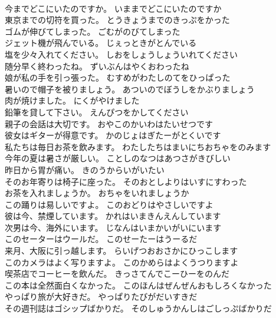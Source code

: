 \documentclass[8pt]{extreport}
\begin{document}
\begin{CJK}{UTF8}{min}
\\	今までどこにいたのですか。	いままでどこにいたのですか 
\\	東京までの切符を買った。	とうきょうまでのきっぷをかった 
\\	ゴムが伸びてしまった。	ごむがのびてしまった 
\\	ジェット機が飛んでいる。	じぇっときがとんでいる 
\\	塩を少々入れてください。	しおをしょうしょういれてください 
\\	随分早く終わったね。	ずいぶんはやくおわったね 
\\	娘が私の手を引っ張った。	むすめがわたしのてをひっぱった 
\\	暑いので帽子を被りましょう。	あついのでぼうしをかぶりましょう 
\\	肉が焼けました。	にくがやけました 
\\	鉛筆を貸して下さい。	えんぴつをかしてください 
\\	親子の会話は大切です。	おやこのかいわはたいせつです 
\\	彼女はギターが得意です。	かのじょはぎたーがとくいです 
\\	私たちは毎日お茶を飲みます。	わたしたちはまいにちおちゃをのみます 
\\	今年の夏は暑さが厳しい。	ことしのなつはあつさがきびしい 
\\	昨日から胃が痛い。	きのうからいがいたい 
\\	そのお年寄りは椅子に座った。	そのおとしよりはいすにすわった 
\\	お茶を入れましょうか。	おちゃをいれましょうか 
\\	この踊りは易しいですよ。	このおどりはやさしいですよ 
\\	彼は今、禁煙しています。	かれはいまきんえんしています 
\\	次男は今、海外にいます。	じなんはいまかいがいにいます 
\\	このセーターはウールだ。	このせーたーはうーるだ 
\\	来月、大阪に引っ越します。	らいげつおおさかにひっこします 
\\	このカメラはよく写りますよ。	このかめらはよくうつりますよ 
\\	喫茶店でコーヒーを飲んだ。	きっさてんでこーひーをのんだ 
\\	この本は全然面白くなかった。	このほんはぜんぜんおもしろくなかった 
\\	やっぱり旅が大好きだ。	やっぱりたびがだいすきだ 
\\	その週刊誌はゴシップばかりだ。	そのしゅうかんしはごしっぷばかりだ 

\end{CJK}
\end{document}
